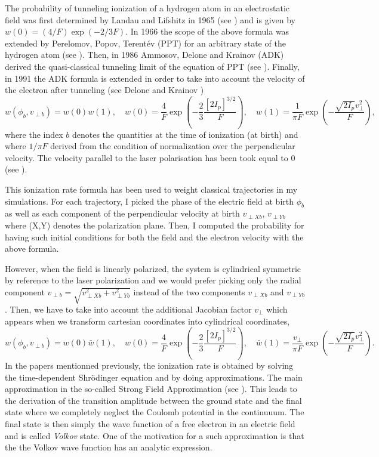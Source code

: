 \documentclass[a4paper]{article}
\begin{document}
The probability of tunneling ionization of a hydrogen atom in an electrostatic field was first determined by Landau and Lifshitz in 1965 (see \cite{Landau_1965}) and is given by $w(0)=(4/F)\exp(-2/3F)$. In 1966 the scope of the above formula was extended by Perelomov, Popov, Terent\'ev (PPT) for an arbitrary state of the hydrogen atom (see \cite{PPT_1966}). Then, in 1986 Ammosov, Delone and Krainov (ADK) derived the quasi-classical tunneling limit of the equation of PPT (see \cite{ADK_1986}). Finally, in 1991 the ADK formula is extended in order to take into account the velocity of the electron after tunneling (see Delone and Krainov \cite{Delone_1991})
\begin{equation} 
\label{ADK_distribution}
w(\phi_{b},v_{\perp b})=w(0)w(1), \quad w(0)=\frac{4}{F}\exp(-\frac{2}{3}\frac{[2I_{p}]^{3/2}}{F}), \quad w(1)=\frac{1}{\pi F}\exp(-\frac{\sqrt{2I_{p}}v_{\perp}^{2}}{F}),
\end{equation}
where the index $b$ denotes the quantities at the time of ionization (at birth) and where $1/\pi F$ derived from the condition of normalization over the perpendicular velocity. 
The velocity parallel to the laser polarisation has been took equal to 0 (see \cite{Hu_1997}).
\par
This ionization rate formula has been used to weight classical trajectories in my simulations. For each trajectory, I picked the phase of the electric field at birth $\phi_{b}$ as well as each component of the perpendicular velocity at birth $v_{\perp X b}$, $v_{\perp Y b}$ where (X,Y) denotes the polarization plane. Then, I computed the probability for having such initial conditions for both the field and the electron velocity with the above formula.
\par
However, when the field is linearly polarized, the system is cylindrical symmetric by reference to the laser polarization and we would prefer picking only the radial component $v_{\perp b}=\sqrt{v_{\perp X b}^{2} + v_{\perp Y b}^{2}}$ instead of the two components $v_{\perp X b}$ and $v_{\perp Y b}$. Then, we have to take into account the additional Jacobian factor $v_{\perp}$ which appears when we transform cartesian coordinates into cylindrical coordinates,
\begin{equation}
w(\phi_{b},v_{\perp b})=w(0)\bar w(1), \quad w(0)=\frac{4}{F}\exp(-\frac{2}{3}\frac{[2I_{p}]^{3/2}}{F}), \quad \bar w(1)=\frac{v_{\perp}}{\pi F}\exp(-\frac{\sqrt{2I_{p}}v_{\perp}^{2}}{F}).
\end{equation}
In the papers mentionned previously, the ionization rate is obtained by solving the time-dependent Shr\"odinger equation and by doing approximations. The main approximation in the so-called Strong Field Approximation (see \cite{Misha_2014}). This leads to the derivation of the transition amplitude between the ground state and the final state where we completely neglect the Coulomb potential in the continuuum. The final state is then simply the wave function of a free electron in an electric field and is called \textit{Volkov} state. One of the motivation for a such approximation is that the the Volkov wave function has an analytic expression.
\end{document}
